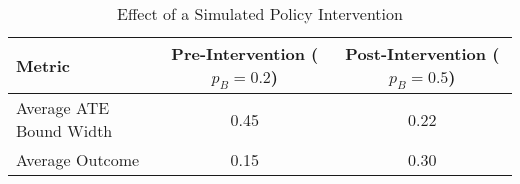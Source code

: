 \begin{table}[h!]
    \centering
    \caption{Effect of a Simulated Policy Intervention}
    \label{tab:policy_sim}
    \begin{tabular}{@{}lcc@{}}
    \toprule
    Metric                & Pre-Intervention ($p_B=0.2$) & Post-Intervention ($p_B=0.5$) \\ \midrule
    Average ATE Bound Width & 0.45                         & 0.22                          \\
    Average Outcome       & 0.15                         & 0.30                          \\ \bottomrule
    \end{tabular}
\end{table}